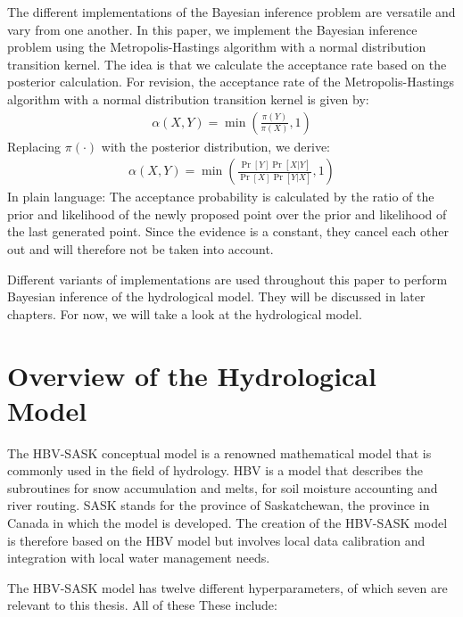The different implementations of the Bayesian inference problem are versatile and vary from one another. In this paper, we implement the Bayesian inference problem using the Metropolis-Hastings algorithm with a normal distribution transition kernel. The idea is that we calculate the acceptance rate based on the posterior calculation. For revision, the acceptance rate of the Metropolis-Hastings algorithm with a normal distribution transition kernel is given by:\cite{mcmc_practice}
\begin{align}
    \alpha(X, Y) = \min (\frac{\pi(Y)}{\pi(X)}, 1)
\end{align}
Replacing $\pi(\cdot)$ with the posterior distribution, we derive:
\begin{align}
    \alpha(X, Y) = \min (\frac{\Pr[Y]\Pr[X|Y]}{\Pr[X]\Pr[Y|X]}, 1)
\end{align}
In plain language: The acceptance probability is calculated by the ratio of the prior and likelihood of the newly proposed point over the prior and likelihood of the last generated point. Since the evidence is a constant, they cancel each other out and will therefore not be taken into account.

Different variants of implementations are used throughout this paper to perform Bayesian inference of the hydrological model. They will be discussed in later chapters. For now, we will take a look at the hydrological model.

\section{Overview of the Hydrological Model}
The HBV-SASK conceptual model is a renowned mathematical model that is commonly used in the field of hydrology. HBV is a model that describes the subroutines for snow accumulation and melts, for soil moisture accounting and river routing.\cite{hbv} SASK stands for the province of Saskatchewan, the province in Canada in which the model is developed. The creation of the HBV-SASK model is therefore based on the HBV model but involves local data calibration and integration with local water management needs.\cite{sask}

The HBV-SASK model has twelve different hyperparameters, of which seven are relevant to this thesis. All of these These include:\cite{hydrology}

